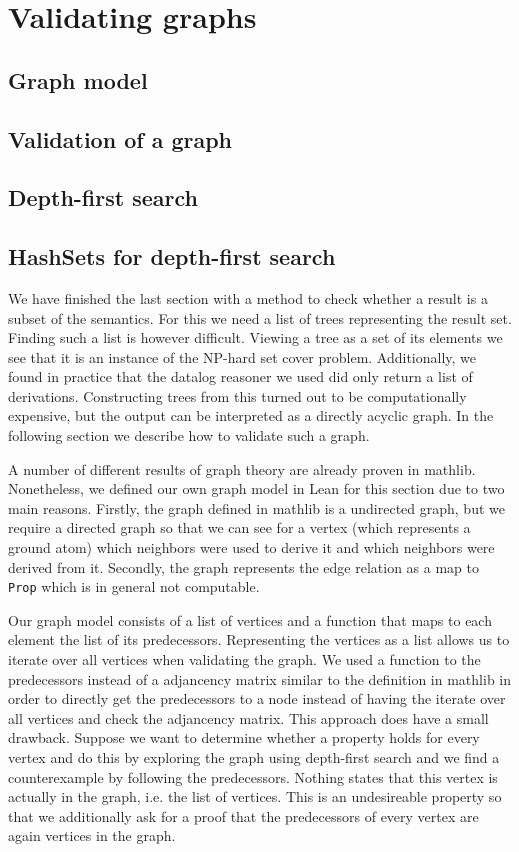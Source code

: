 \section{Validating graphs}\label{sec:valGraph}

\subsection{Graph model}

\subsection{Validation of a graph}

\subsection{Depth-first search}

\subsection{HashSets for depth-first search}

We have finished the last section with a method to check whether a result is a subset of the semantics. For this we need a list of trees representing the result set. Finding such a list is however difficult. Viewing a tree as a set of its elements we see that it is an instance of the NP-hard set cover problem. Additionally, we found in practice that the datalog reasoner we used did only return a list of derivations. Constructing trees from this turned out to be computationally expensive, but the output can be interpreted as a directly acyclic graph. In the following section we describe how to validate such a graph.

A number of different results of graph theory are already proven in mathlib. Nonetheless, we defined our own graph model in Lean for this section due to two main reasons. Firstly, the graph defined in mathlib is a undirected graph, but we require a directed graph so that we can see for a vertex (which represents a ground atom) which neighbors were used to derive it and which neighbors were derived from it. Secondly, the graph represents the edge relation as a map to \texttt{Prop} which is in general not computable.


Our graph model consists of a list of vertices and a function that maps to each element the list of its predecessors. Representing the vertices as a list allows us to iterate over all vertices when validating the graph. We used a function to the predecessors instead of a adjancency matrix similar to the definition in mathlib in order to directly get the predecessors to a node instead of having the iterate over all vertices and check the adjancency matrix. This approach does have a small drawback. Suppose we want to determine whether a property holds for every vertex and do this by exploring the graph using depth-first search and we find a counterexample by following the predecessors. Nothing states that this vertex is actually in the graph, i.e. the list of vertices. This is an undesireable property so that we additionally ask for a proof that the predecessors of every vertex are again vertices in the graph.

